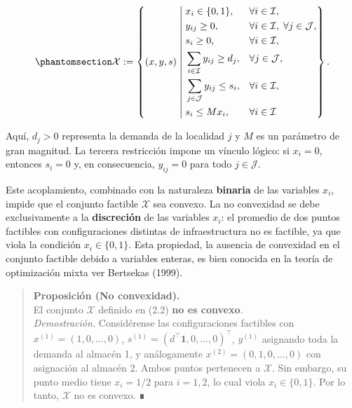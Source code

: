 \documentclass[
  spanish,
  us-letterpaper,
  DIV=11,
  numbers=noendperiod]{scrreprt}
\numberwithin{equation}{section}
\begin{document}
\begin{equation}\phantomsection\label{eq-EF}{
\mathcal{X} := \left\{ (x, y, s) \;\middle|\;
\begin{aligned}
& x_i \in \{0,1\}, && \forall i \in \mathcal{I}, \\
& y_{ij} \ge 0,    && \forall i \in \mathcal{I},\; \forall j \in \mathcal{J}, \\
& s_i \ge 0,       && \forall i \in \mathcal{I}, \\
& \sum_{i \in \mathcal{I}} y_{ij} \ge d_j, && \forall j \in \mathcal{J}, \\
& \sum_{j \in \mathcal{J}} y_{ij} \le s_i, && \forall i \in \mathcal{I}, \\
& s_i \le M x_i,   && \forall i \in \mathcal{I}
\end{aligned}
\right\}.
}\end{equation}

Aquí, \(d_j > 0\) representa la demanda de la localidad \(j\) y \(M\) es
un parámetro de gran magnitud. La tercera restricción impone un vínculo
lógico: si \(x_i = 0\), entonces \(s_i = 0\) y, en consecuencia,
\(y_{ij} = 0\) para todo \(j \in \mathcal{J}\).

Este acoplamiento, combinado con la naturaleza \textbf{binaria} de las
variables \(x_i\), impide que el conjunto factible \(\mathcal{X}\) sea
convexo. La no convexidad se debe exclusivamente a la
\textbf{discreción} de las variables \(x_i\): el promedio de dos puntos
factibles con configuraciones distintas de infraestructura no es
factible, ya que viola la condición \(x_i \in \{0,1\}\). Esta propiedad,
la ausencia de convexidad en el conjunto factible debido a variables
enteras, es bien conocida en la teoría de optimización mixta ver
Bertsekas (1999).

\begin{quote}
\textbf{Proposición (No convexidad).}\\
El conjunto \(\mathcal{X}\) definido en (2.2) \textbf{no es convexo}.\\
\emph{Demostración.} Considérense las configuraciones factibles con
\(x^{(1)} = (1,0,\dots,0)\),
\(s^{(1)} = (d^\top \mathbf{1}, 0, \dots, 0)^\top\), \(y^{(1)}\)
asignando toda la demanda al almacén 1, y análogamente
\(x^{(2)} = (0,1,0,\dots,0)\) con asignación al almacén 2. Ambos puntos
pertenecen a \(\mathcal{X}\). Sin embargo, su punto medio tiene
\(x_i = 1/2\) para \(i=1,2\), lo cual viola \(x_i \in \{0,1\}\). Por lo
tanto, \(\mathcal{X}\) no es convexo. ∎
\end{quote}
\end{document}
